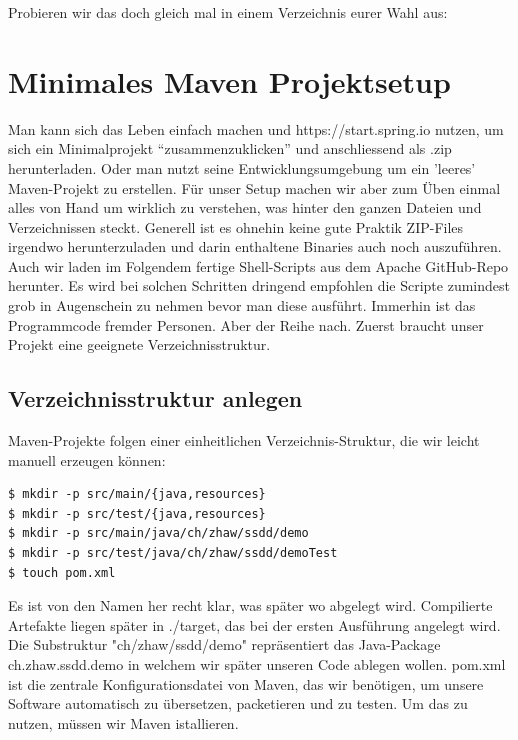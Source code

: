 Probieren wir das doch gleich mal in einem Verzeichnis eurer Wahl aus:
\begin{terminalbox}
\begin{VerbatimBreak}
\end{VerbatimBreak}
\end{terminalbox}

\section{Minimales Maven Projektsetup}

Man kann sich das Leben einfach machen und https://start.spring.io nutzen,
um sich ein Minimalprojekt ``zusammenzuklicken'' und anschliessend
als .zip herunterladen. Oder man nutzt seine Entwicklungsumgebung um ein 
'leeres' Maven-Projekt zu erstellen.
Für unser Setup machen wir aber zum Üben einmal alles
von Hand um wirklich zu verstehen, was hinter den ganzen Dateien und
Verzeichnissen steckt. Generell ist es ohnehin keine gute Praktik ZIP-Files
irgendwo herunterzuladen und darin enthaltene Binaries auch noch auszuführen.
Auch wir laden im Folgendem fertige Shell-Scripts aus dem Apache GitHub-Repo
herunter. Es wird bei solchen Schritten dringend empfohlen die Scripte
zumindest grob in Augenschein zu nehmen bevor man diese ausführt. Immerhin ist
das Programmcode fremder Personen.
Aber der Reihe nach. Zuerst braucht unser Projekt eine geeignete
Verzeichnisstruktur.

\subsection{Verzeichnisstruktur anlegen}
Maven-Projekte folgen einer einheitlichen Verzeichnis-Struktur, die wir
leicht manuell erzeugen können:
\begin{terminalbox}
    \begin{verbatim}
$ mkdir -p src/main/{java,resources}
$ mkdir -p src/test/{java,resources}
$ mkdir -p src/main/java/ch/zhaw/ssdd/demo
$ mkdir -p src/test/java/ch/zhaw/ssdd/demoTest
$ touch pom.xml
    \end{verbatim}
\end{terminalbox}
Es ist von den Namen her recht klar, was später wo abgelegt wird. Compilierte
Artefakte liegen später in ./target, das bei der ersten Ausführung angelegt 
wird. Die Substruktur "ch/zhaw/ssdd/demo" repräsentiert das Java-Package 
ch.zhaw.ssdd.demo in welchem wir später unseren Code ablegen wollen.
pom.xml ist die zentrale Konfigurationsdatei von Maven, das wir benötigen, um
unsere Software automatisch zu übersetzen, packetieren und zu testen. Um das
zu nutzen, müssen wir Maven istallieren.

